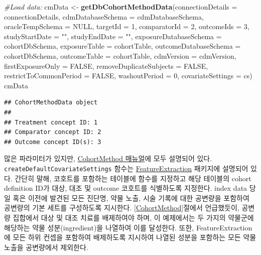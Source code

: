 \documentclass[11pt]{book}
\newenvironment{Shaded}{\begin{snugshade}}{\end{snugshade}}
\newcommand{\KeywordTok}[1]{\textcolor[rgb]{0.13,0.29,0.53}{\textbf{#1}}}
\newcommand{\DataTypeTok}[1]{\textcolor[rgb]{0.13,0.29,0.53}{#1}}
\newcommand{\DecValTok}[1]{\textcolor[rgb]{0.00,0.00,0.81}{#1}}
\newcommand{\StringTok}[1]{\textcolor[rgb]{0.31,0.60,0.02}{#1}}
\newcommand{\CommentTok}[1]{\textcolor[rgb]{0.56,0.35,0.01}{\textit{#1}}}
\newcommand{\OtherTok}[1]{\textcolor[rgb]{0.56,0.35,0.01}{#1}}
\newcommand{\NormalTok}[1]{#1}
\theoremstyle{definition}
\theoremstyle{definition}
\theoremstyle{definition}
\theoremstyle{remark}
\begin{document}
\begin{Shaded}
\begin{Highlighting}[]
\CommentTok{#Load data:}
\NormalTok{cmData <-}\StringTok{ }\KeywordTok{getDbCohortMethodData}\NormalTok{(}\DataTypeTok{connectionDetails =}\NormalTok{ connectionDetails,}
                                \DataTypeTok{cdmDatabaseSchema =}\NormalTok{ cdmDatabaseSchema,}
                                \DataTypeTok{oracleTempSchema =} \OtherTok{NULL}\NormalTok{,}
                                \DataTypeTok{targetId =} \DecValTok{1}\NormalTok{,}
                                \DataTypeTok{comparatorId =} \DecValTok{2}\NormalTok{,}
                                \DataTypeTok{outcomeIds =} \DecValTok{3}\NormalTok{,}
                                \DataTypeTok{studyStartDate =} \StringTok{""}\NormalTok{,}
                                \DataTypeTok{studyEndDate =} \StringTok{""}\NormalTok{,}
                                \DataTypeTok{exposureDatabaseSchema =}\NormalTok{ cohortDbSchema,}
                                \DataTypeTok{exposureTable =}\NormalTok{ cohortTable,}
                                \DataTypeTok{outcomeDatabaseSchema =}\NormalTok{ cohortDbSchema,}
                                \DataTypeTok{outcomeTable =}\NormalTok{ cohortTable,}
                                \DataTypeTok{cdmVersion =}\NormalTok{ cdmVersion,}
                                \DataTypeTok{firstExposureOnly =} \OtherTok{FALSE}\NormalTok{,}
                                \DataTypeTok{removeDuplicateSubjects =} \OtherTok{FALSE}\NormalTok{,}
                                \DataTypeTok{restrictToCommonPeriod =} \OtherTok{FALSE}\NormalTok{,}
                                \DataTypeTok{washoutPeriod =} \DecValTok{0}\NormalTok{,}
                                \DataTypeTok{covariateSettings =}\NormalTok{ cs)}
\NormalTok{cmData}
\end{Highlighting}
\end{Shaded}

\begin{verbatim}
## CohortMethodData object
## 
## Treatment concept ID: 1
## Comparator concept ID: 2
## Outcome concept ID(s): 3
\end{verbatim}

많은 파라미터가 있지만,
\href{https://ohdsi.github.io/CohortMethod/reference/}{CohortMethod
매뉴얼}에 모두 설명되어 있다. \texttt{createDefaultCovariateSettings}
함수는
\href{https://ohdsi.github.io/FeatureExtraction/}{FeatureExtraction}
패키지에 설명되어 있다. 간단히 말해, 코호트를 포함하는 테이블에 함수를
지정하고 해당 테이블의 cohort definition ID가 대상, 대조 및 outcome
코호트를 식별하도록 지정한다. index data 당일 혹은 이전에 발견된 모든
진단명, 약물 노출, 시술 기록에 대한 공변량을 포함하여 공변량의 기본
세트를 구성하도록 지시한다. \ref{CohortMethod}절에서 언급했듯이, 공변량
집합에서 대상 및 대조 치료를 배제하여야 하며, 이 예제에서는 두 가지의
약물군에 해당하는 약물 성분(ingredient)을 나열하여 이를 달성한다. 또한,
FeatureExtraction에 모든 하위 컨셉을 포함하여 배제하도록 지시하여 나열된
성분을 포함하는 모든 약물 노출을 공변량에서 제외한다.
\end{document}
